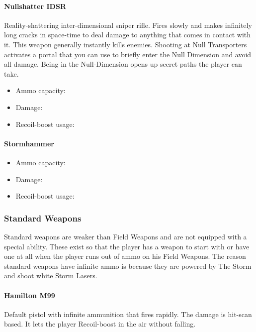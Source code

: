 \documentclass[12pt]{article}
\begin{document}
\paragraph{Nullshatter IDSR}

Reality-shattering inter-dimensional sniper rifle. Fires slowly and makes infinitely long cracks in space-time to deal damage to anything that comes in contact with it. This weapon generally instantly kills enemies. Shooting at Null Transporters activates a portal that you can use to briefly enter the Null Dimension and avoid all damage. Being in the Null-Dimension opens up secret paths the player can take.

\begin{itemize}
	\item Ammo capacity: 
	\item Damage: 
	\item Recoil-boost usage:
\end{itemize}

\paragraph{Stormhammer}

\begin{itemize}
	\item Ammo capacity: 
	\item Damage: 
	\item Recoil-boost usage:
\end{itemize}

\subsubsection{Standard Weapons}

Standard weapons are weaker than Field Weapons and are not equipped with a special ability. These exist so that the player has a weapon to start with or have one at all when the player runs out of ammo on his Field Weapons. The reason standard weapons have infinite ammo is because they are powered by The Storm and shoot white Storm Lasers. 

\paragraph{Hamilton M99} 

Default pistol with infinite ammunition that fires rapidly. The damage is hit-scan based. It lets the player Recoil-boost in the air without falling.
\end{document}
